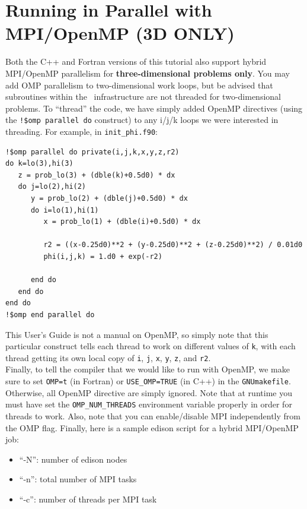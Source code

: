 \section{Running in Parallel with MPI/OpenMP (3D ONLY)}\label{Sec:OpenMP}
Both the C++ and Fortran versions of this tutorial also support hybrid MPI/OpenMP parallelism for 
{\bf three-dimensional problems only}.
You may add OMP parallelism to two-dimensional work loops, but be advised that subroutines within the \BoxLib\ infrastructure 
are not threaded for two-dimensional problems.
To ``thread'' the code, we have simply added OpenMP directives (using the {\tt !\$omp parallel do} 
construct) to any i/j/k loops we were interested in threading.  For example, in {\tt init\_phi.f90}:
\begin{lstlisting}[backgroundcolor=\color{light-green}]
!$omp parallel do private(i,j,k,x,y,z,r2)
do k=lo(3),hi(3)
   z = prob_lo(3) + (dble(k)+0.5d0) * dx
   do j=lo(2),hi(2)
      y = prob_lo(2) + (dble(j)+0.5d0) * dx
      do i=lo(1),hi(1)
         x = prob_lo(1) + (dble(i)+0.5d0) * dx

         r2 = ((x-0.25d0)**2 + (y-0.25d0)**2 + (z-0.25d0)**2) / 0.01d0
         phi(i,j,k) = 1.d0 + exp(-r2)
 
      end do
   end do
end do
!$omp end parallel do
\end{lstlisting}
This User's Guide is not a manual on OpenMP, so simply note that this particular 
construct tells each thread to work on different values of {\tt k}, with each 
thread getting its own local copy of {\tt i}, {\tt j}, {\tt x}, {\tt y}, {\tt z}, and {\tt r2}.\\

Finally, to tell the compiler that we would like to run with OpenMP, we make sure to
set {\tt OMP=t} (in Fortran) or {\tt USE\_OMP=TRUE} (in C++) in the {\tt GNUmakefile}.
Otherwise, all OpenMP directive are
simply ignored.  Note that at runtime you must have set the 
{\tt OMP\_NUM\_THREADS} environment variable properly in order for threads to work.
Also, note that you can enable/disable MPI independently from the OMP flag.  Finally,
here is a sample edison script for a hybrid MPI/OpenMP job:

\begin{itemize}
\item ``-N'': number of edison nodes
\item ``-n'': total number of MPI tasks
\item ``-c'': number of threads per MPI task

\end{itemize}
